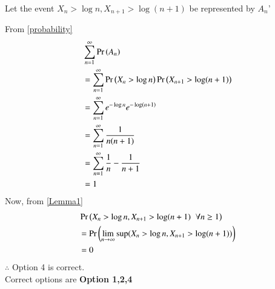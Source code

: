 \documentclass[journal,12pt,twocolumn]{IEEEtran}
\begin{document}
\begin{enumerate}
    Let the event $X_n > \log n,X_{n+1}>\log (n+1)$ be represented by $A_n$'
    
    From \eqref{probability}
    \begin{align}
        &\sum_{n=1}^{\infty}\Pr\left(A_n\right)\\
        &= \sum_{n=1}^{\infty}\Pr\left(X_n>\log n\right)\Pr\left(X_{n+1}>\log (n+1)\right)\\
        &=\sum_{n=1}^{\infty}e^{-\log n}e^{-\log (n+1)}\\
        &=\sum_{n=1}^{\infty}\frac{1}{n(n+1)}\\
        &=\sum_{n=1}^{\infty}\frac{1}{n}-\frac{1}{n+1}\\
        &=1
    \end{align}
    Now, from \eqref{Lemma1}
    \begin{align}
        &\Pr\left(X_n>\log n,X_{n+1}>\log (n+1)\hspace{0.2cm}\forall n\geq1\right)\\
        &=\Pr\left(\lim_{n \rightarrow \infty}\sup ( X_n>\log n,X_{n+1}>\log (n+1))\right)\\
        &=0
    \end{align}
    $\therefore$ Option 4 is correct.\\
    Correct options are \textbf{Option 1,2,4}
\end{enumerate}
\end{document}
